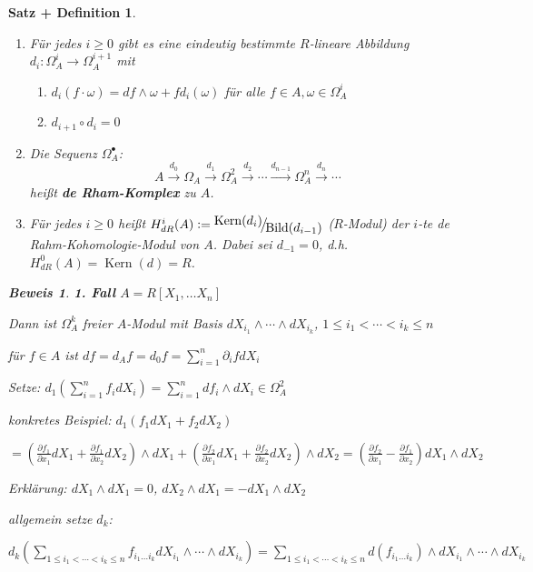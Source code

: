 \documentclass[a4paper,12pt]{scrbook}
\theoremstyle{break}
\newtheorem{SatzDef}[Satz]{Satz + Definition}
\theoremstyle{nonumberbreak}
\newtheorem{Bew}{Beweis}
\theoremstyle{nonumberplain}
\newcommand{\emp}[1]{\textbf{\emph{#1}}}
\newcommand{\defeqr}[0]{\mathrel{\mathop:}=}
\DeclareMathOperator{\Kern}{Kern}
\DeclareMathOperator{\Bild}{Bild}
\newcommand{\FakRaum}[2]{
  \raisebox{0.7ex}{\ensuremath{#1}}
  \ensuremath{\mkern-3mu}\big/\ensuremath{\mkern-3mu}
  \raisebox{-0.6ex}{\ensuremath{#2}}}
\begin{document}
\begin{SatzDef}
\begin{enumerate}
\item[a)] Für jedes $i \geq 0$ gibt es eine eindeutig bestimmte $R$-lineare Abbildung $d_i : \Omega^i_A \rightarrow \Omega^{i+1}_A$ mit
\begin{enumerate}
\item[(i)] $d_i(f \cdot \omega) = df \wedge \omega + f d_i(\omega)$ für alle $f \in A, \omega \in \Omega^i_A$
\item[(ii)] $d_{i+1} \circ d_i = 0$
\end{enumerate}

\item[b)]
Die Sequenz $\Omega^\bullet_A$:
$$A \overset{d_0}{\rightarrow} \Omega_A \overset{d_1}{\rightarrow} \Omega^2_A \overset{d_2}{\rightarrow} \cdots \overset{d_{n-1}}{\rightarrow} \Omega^n_A  \overset{d_n}{\rightarrow} \cdots$$
heißt \emp{de Rham-Komplex} zu $A$.

\item[c)]
Für jedes $i\geq 0$ hei\ss t $H_{dR}^i(A)\defeqr \FakRaum{\Kern(d_i)}{\Bild(d_{i-1})}$ ($R$-Modul)
der $i$-te de Rahm-Kohomologie-Modul von $A$. Dabei sei $d_{-1}=0$, d.h. $H_{dR}^0(A)=\Kern(d)=R$.

\end{enumerate}

\begin{Bew}
\textbf{1. Fall} $A = R[X_1, \ldots X_n]$

Dann ist $\Omega^k_A$ freier $A$-Modul mit Basis $d X_{i_1} \wedge \cdots \wedge d X_{i_k}$, $1 \leq i_1 < \cdots < i_k \leq n$

für $f \in A$ ist $df = d_A f = d_0 f = \sum_{i=1}^n \partial_i f d X_i$

Setze: $d_1(\sum_{i=1}^n f_i d X_i) = \sum_{i=1}^n d f_i \wedge d X_i \in \Omega^2_A$

konkretes Beispiel: $d_1(f_1 dX_1 + f_2 dX_2)$

$= (\frac{\partial f_1}{\partial x_1} dX_1 + \frac{\partial f_1}{\partial x_2} dX_2) \wedge dX_1 + (\frac{\partial f_2}{\partial x_1} dX_1 + \frac{\partial f_2}{\partial x_2} dX_2) \wedge dX_2 = (\frac{\partial f_2}{\partial x_1} - \frac{\partial f_1}{\partial x_2}) dX_1 \wedge dX_2$

Erklärung: $dX_1 \wedge dX_1 = 0$, $dX_2 \wedge dX_1 = - dX_1 \wedge dX_2$

allgemein setze $d_k$:

$d_k(\displaystyle\sum_{1 \leq i_1 < \cdots < i_k \leq n} f_{i_1 \ldots i_k} dX_{i_1} \wedge \cdots \wedge dX_{i_k}) = \sum_{1 \leq i_1 < \cdots < i_k \leq n} d(f_{i_1 \ldots i_k}) \wedge dX_{i_1} \wedge \cdots \wedge dX_{i_k}$


\end{Bew}
\end{SatzDef}
\end{document}
